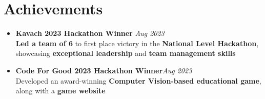 \section{Achievements}
\begin{itemize}
	\item \textbf{Kavach 2023 Hackathon Winner}  \hfill \textit{Aug 2023} \\
	      \textbf{Led a team of 6} to first place victory in the \textbf{National Level Hackathon}, showcasing \textbf{exceptional leadership} and \textbf{team management skills}
	\item \textbf{Code For Good 2023 Hackathon Winner}\hfill \textit{Aug 2023} \\
	      Developed an award-winning \textbf{Computer Vision-based educational game}, along with a \textbf{game website}
\end{itemize}